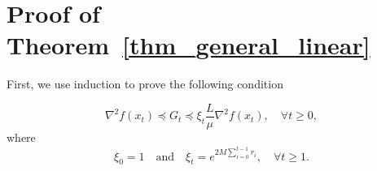 \documentclass[11pt]{article}
\numberwithin{assumption}{section}
\numberwithin{remark}{section}
\numberwithin{theorem}{section}
\begin{document}
\section{Proof of Theorem~\ref{thm_general_linear}}\label{sec:proof_of_thm_general_linear}

First, we use induction to prove the following condition

\begin{equation}\label{proof_thm_general_linear_1}
\nabla^2{f(x_t)} \preceq G_t \preceq \xi_t \frac{L}{\mu}\nabla^2{f(x_t)}, \quad \forall t \geq 0,
\end{equation}
where
\begin{equation}\label{proof_thm_general_linear_2}
    \xi_0 = 1 \quad \text{and} \quad \xi_t = e^{2M\sum_{i = 0}^{t - 1}r_i}, \quad \forall t \geq 1.
\end{equation}
\end{document}

